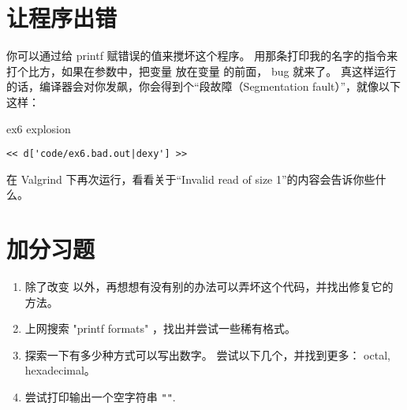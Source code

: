 \section{让程序出错}

你可以通过给 printf 赋错误的值来搅坏这个程序。 用那条打印我的名字的指令来打个比方，如果在参数中，把变量  放在变量  的前面， bug 就来了。 真这样运行的话，编译器会对你发飙，你会得到个“段故障（Segmentation fault）”，就像以下这样：

\begin{code}{ex6 explosion}
\begin{lstlisting}
<< d['code/ex6.bad.out|dexy'] >>
\end{lstlisting}
\end{code}

在 Valgrind 下再次运行，看看关于“Invalid read of size 1”的内容会告诉你些什么。


\section{加分习题}

\begin{enumerate}
\item 除了改变  以外，再想想有没有别的办法可以弄坏这个代码，并找出修复它的方法。
\item 上网搜索 "printf formats" ，找出并尝试一些稀有格式。
\item 探索一下有多少种方式可以写出数字。 尝试以下几个，并找到更多： octal, hexadecimal。
\item 尝试打印输出一个空字符串 \verb|""|.
\end{enumerate}

